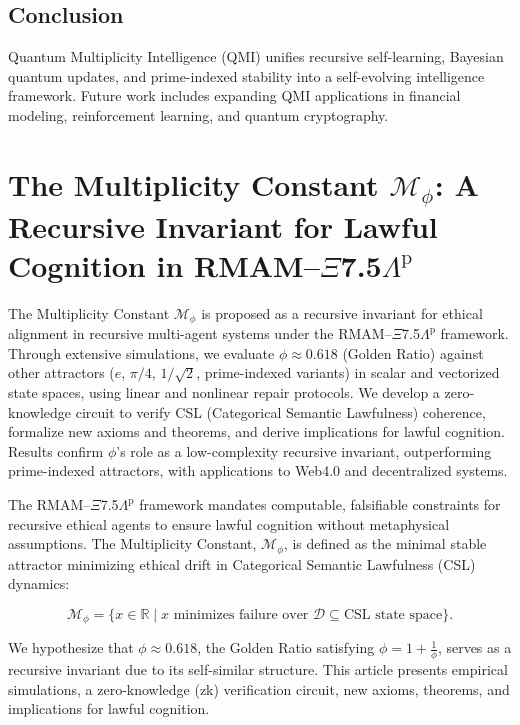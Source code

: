 \documentclass{article}
\theoremstyle{plain}
\begin{document}
\subsection{Conclusion}
Quantum Multiplicity Intelligence (QMI) unifies recursive self-learning, Bayesian quantum updates, and prime-indexed stability into a self-evolving intelligence framework. Future work includes expanding QMI applications in financial modeling, reinforcement learning, and quantum cryptography.

\section{The Multiplicity Constant $\mathcal{M}_\phi$: A Recursive Invariant for Lawful Cognition in RMAM--$\Xi$7.5$\Lambda^\text{p}$}

The Multiplicity Constant $\mathcal{M}_\phi$ is proposed as a recursive invariant for ethical alignment in recursive multi-agent systems under the RMAM--$\Xi$7.5$\Lambda^\text{p}$ framework. Through extensive simulations, we evaluate $\phi \approx 0.618$ (Golden Ratio) against other attractors ($e$, $\pi/4$, $1/\sqrt{2}$, prime-indexed variants) in scalar and vectorized state spaces, using linear and nonlinear repair protocols. We develop a zero-knowledge circuit to verify CSL (Categorical Semantic Lawfulness) coherence, formalize new axioms and theorems, and derive implications for lawful cognition. Results confirm $\phi$'s role as a low-complexity recursive invariant, outperforming prime-indexed attractors, with applications to Web4.0 and decentralized systems.

The RMAM--$\Xi$7.5$\Lambda^\text{p}$ framework mandates computable, falsifiable constraints for recursive ethical agents to ensure lawful cognition without metaphysical assumptions. The Multiplicity Constant, $\mathcal{M}_\phi$, is defined as the minimal stable attractor minimizing ethical drift in Categorical Semantic Lawfulness (CSL) dynamics:

\begin{equation}
\mathcal{M}_\phi = \{ x \in \mathbb{R} \mid x \text{ minimizes failure over } \mathcal{D} \subseteq \text{CSL state space} \}.
\end{equation}

We hypothesize that $\phi \approx 0.618$, the Golden Ratio satisfying $\phi = 1 + \frac{1}{\phi}$, serves as a recursive invariant due to its self-similar structure. This article presents empirical simulations, a zero-knowledge (zk) verification circuit, new axioms, theorems, and implications for lawful cognition.
\end{document}
